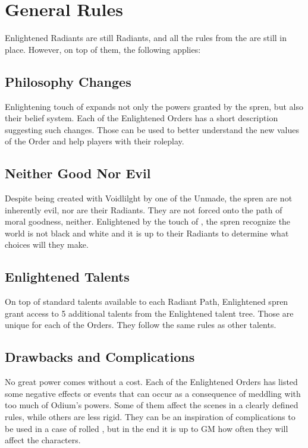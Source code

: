 \newpage
\section{General Rules}

Enlightened Radiants are still Radiants, and all the rules from the \handbook{} are still in place. However, on top of them, the following applies:

\subsection{Philosophy Changes}

Enlightening touch of \npcSjaAnat{} expands not only the powers granted by the spren, but also their belief system. Each of the Enlightened Orders has a short description suggesting such changes. Those can be used to better understand the new values of the Order and help players with their roleplay.

\subsection{Neither Good Nor Evil}

Despite being created with Voidlilght by one of the Unmade, the spren are not inherently evil, nor are their Radiants. They are not forced onto the path of moral goodness, neither. Enlightened by the touch of \npcSjaAnat{}, the spren recognize the world is not black and white and it is up to their Radiants to determine what choices will they make.

\subsection{Enlightened Talents}

On top of standard talents available to each Radiant Path, Enlightened spren grant access to 5 additional talents from the Enlightened talent tree. Those are unique for each of the Orders. They follow the same rules as other talents.

\subsection{Drawbacks and Complications}

No great power comes without a cost. Each of the Enlightened Orders has listed some negative effects or events that can occur as a consequence of meddling with too much of Odium's powers. Some of them affect the scenes in a clearly defined rules, while others are less rigid. They can be an inspiration of complications to be used in a case of rolled \iconComp{}, but in the end it is up to GM how often they will affect the characters.

